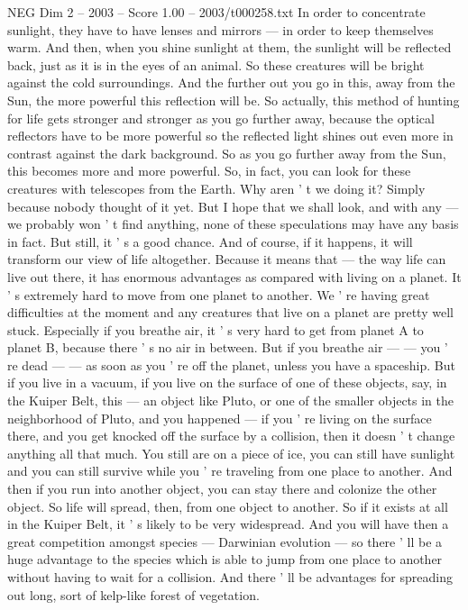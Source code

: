 \begin{textsample}{NEG Dim 2 – 2003 – Score 1.00 – 2003/t000258.txt}
In order to concentrate sunlight, they have to have lenses and mirrors — in order to keep themselves warm.
And then, when you shine sunlight at them, the sunlight will be reflected back, just as it is in the eyes of an animal.
So these creatures will be bright against the cold surroundings.
And the further out you go in this, away from the Sun, the more powerful this reflection will be.
So actually, this method of hunting for life gets stronger and stronger as you go further away, because the optical reflectors have to be more powerful so the reflected light shines out even more in contrast against the dark background.
So as you go further away from the Sun, this becomes more and more powerful.
So, in fact, you can look for these creatures with telescopes from the Earth.
Why aren ' t we doing it?
Simply because nobody thought of it yet.
But I hope that we shall look, and with any — we probably won ' t find anything, none of these speculations may have any basis in fact.
But still, it ' s a good chance.
And of course, if it happens, it will transform our view of life altogether.
Because it means that — the way life can live out there, it has enormous advantages as compared with living on a planet.
It ' s extremely hard to move from one planet to another.
We ' re having great difficulties at the moment and any creatures that live on a planet are pretty well stuck.
Especially if you breathe air, it ' s very hard to get from planet A to planet B, because there ' s no air in between.
But if you breathe air — — you ' re dead — — as soon as you ' re off the planet, unless you have a spaceship.
But if you live in a vacuum, if you live on the surface of one of these objects, say, in the Kuiper Belt, this — an object like Pluto, or one of the smaller objects in the neighborhood of Pluto, and you happened — if you ' re living on the surface there, and you get knocked off the surface by a collision, then it doesn ' t change anything all that much.
You still are on a piece of ice, you can still have sunlight and you can still survive while you ' re traveling from one place to another.
And then if you run into another object, you can stay there and colonize the other object.
So life will spread, then, from one object to another.
So if it exists at all in the Kuiper Belt, it ' s likely to be very widespread.
And you will have then a great competition amongst species — Darwinian evolution — so there ' ll be a huge advantage to the species which is able to jump from one place to another without having to wait for a collision.
And there ' ll be advantages for spreading out long, sort of kelp-like forest of vegetation.

\end{textsample}
